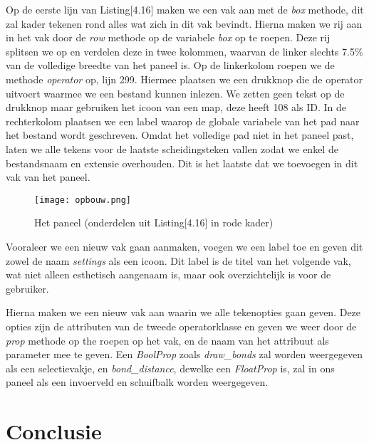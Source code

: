 

Op de eerste lijn van Listing[4.16] maken we een vak aan met de \textit{box} methode, dit zal kader tekenen rond alles wat zich in dit vak bevindt. Hierna maken we rij aan in het vak door de \textit{row} methode op de variabele \textit{box} op te roepen. Deze rij splitsen we op en verdelen deze in twee kolommen, waarvan de linker slechts 7.5\% van de volledige breedte van het paneel is. Op de linkerkolom roepen we de methode \textit{operator} op, lijn 299. Hiermee plaatsen we een drukknop die de operator uitvoert waarmee we een bestand kunnen inlezen. We zetten geen tekst op de drukknop maar gebruiken het icoon van een map, deze heeft 108 als ID. In de rechterkolom plaatsen we een label waarop de globale variabele van het pad naar het bestand wordt geschreven. Omdat het volledige pad niet in het paneel past, laten we alle tekens voor de laatste scheidingsteken vallen zodat we enkel de bestandsnaam en extensie overhouden. Dit is het laatste dat we toevoegen in dit vak van het paneel.
\par
\begin{figure}[H]
\begin{center}
\texttt{[image: opbouw.png]}
\caption{Het paneel (onderdelen uit Listing[4.16] in rode kader)}
\end{center}
\end{figure}

Vooraleer we een nieuw vak gaan aanmaken, voegen we een label toe en geven dit zowel de naam \textit{settings} als een icoon. Dit label is de titel van het volgende vak, wat niet alleen esthetisch aangenaam is, maar ook overzichtelijk is voor de gebruiker.
\par 
Hierna maken we een nieuw vak aan waarin we alle tekenopties gaan geven. Deze opties zijn de attributen van de tweede operatorklasse en geven we weer door de \textit{prop} methode op the roepen op het vak, en de naam van het attribuut als parameter mee te geven. Een \textit{BoolProp} zoals \textit{draw\_bonds} zal worden weergegeven als een selectievakje, en \textit{bond\_distance}, dewelke een \textit{FloatProp} is, zal in ons paneel als een invoerveld en schuifbalk worden weergegeven.
     
  
\section{Conclusie}


